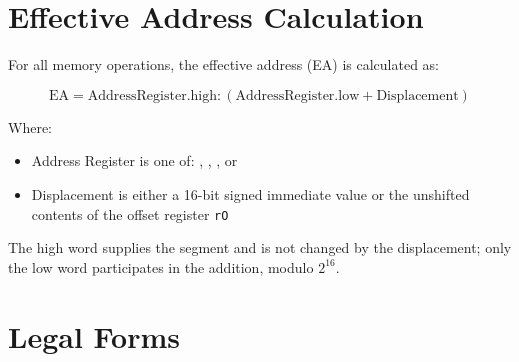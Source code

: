 \section{Effective Address Calculation}

For all memory operations, the effective address (EA) is calculated as:

\begin{equation}
	\text{EA} = \text{AddressRegister.high} : (\text{AddressRegister.low} + \text{Displacement})
\end{equation}

Where:
\begin{itemize}
	\item Address Register is one of: , , , or 
	\item Displacement is either a 16-bit signed immediate value or the unshifted contents of the offset register \texttt{rO}
\end{itemize}

The high word supplies the segment and is not changed by the displacement; only the low word participates in the
addition, modulo $2^{16}$.

\section{Legal Forms}

